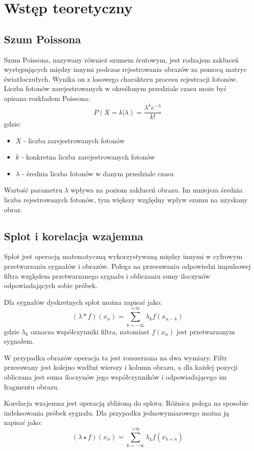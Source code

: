 \documentclass{article}
\begin{document}
\section{Wstęp teoretyczny}
\subsection{Szum Poissona}
Szum Poissona, nazywany również szumem śrutowym, jest rodzajem zakłuceń występujących między innymi podczas rejestrowania obrazów za pomocą matryc światłoczułych. Wynika on z losowego charakteru procesu rejestracji fotonów. Liczba fotonów zarejestrowanych w określonym przedziale czasu może być opisana rozkładem Poissona: $$ P(X=k|\lambda) = \frac{\lambda^k e^{-\lambda}}{k!} $$ gdzie:
\begin{itemize}
  \item $X$ - liczba zarejestrowanych fotonów
  \item $k$ - konkretna liczba zarejestrowanych fotonów
  \item $\lambda$ - średnia liczba fotonów w danym przedziale czasu
\end{itemize}

Wartość parametru $\lambda$ wpływa na poziom zakłuceń obrazu. Im mniejsza średnia liczba rejestrowanych fotonów, tym większy względny wpływ szumu na uzyskany obraz.

\subsection{Splot i korelacja wzajemna}
Splot jest operacją matematyczną wykorzystywaną między innymi w cyfrowym przetwarzaniu sygnałów i obrazów. Polega na przesuwaniu odpowiedzi impulsowej filtra względem przetwarzanego sygnału i obliczaniu sumy iloczynów odpowiadających sobie próbek.

Dla sygnałów dyskretnych splot można zapisać jako: $$ (\lambda * f)(x_n) = \sum_{k = -\infty}^{+\infty} \lambda_k f(x_{n-k}) $$ gdzie $\lambda_k$ oznacza współczynniki filtra, natomiast $f(x_n)$ jest przetwarzanym sygnałem.

W przypadku obrazów operacja ta jest rozszerzana na dwa wymiary. Filtr przesuwany jest kolejno wzdłuż wierszy i kolumn obrazu, a dla każdej pozycji obliczana jest suma iloczynów jego współczynników i odpowiadającego im fragmentu obrazu.

Korelacja wzajemna jest operacją zbliżoną do splotu. Różnica polega na sposobie indeksowania próbek sygnału. Dla przypadku jednowymiarowego można ją zapisać jako: $$ (\lambda \star f)(x_n) = \sum_{k=-\infty}^{+\infty} \lambda_k f(x_{k+n}) $$
\end{document}
